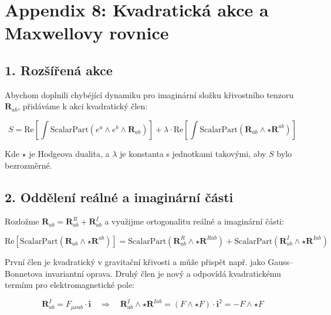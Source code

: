 
\appendix

\section*{Appendix 8: Kvadratick\'a akce a Maxwellovy rovnice}


\subsection*{1. Roz\v{s}\'{i}\v{r}en\'a akce}

Abychom doplnili chyb\'ej\'ic\'i dynamiku pro imagin\'arn\'i slo\v{z}ku k\v{r}ivostn\'iho tenzoru \( \mathbf{R}_{ab} \), p\v{r}id\'av\'ame k akci kvadratick\'y \v{c}len:

\begin{equation}
S = \text{Re} \left[ \int \text{ScalarPart} \left( e^a \wedge e^b \wedge \mathbf{R}_{ab} \right) \right] + \lambda \cdot \text{Re} \left[ \int \text{ScalarPart} \left( \mathbf{R}_{ab} \wedge \star \mathbf{R}^{ab} \right) \right]
\end{equation}

Kde \( \star \) je Hodgeova dualita, a \( \lambda \) je konstanta s jednotkami takov\'ymi, aby \( S \) bylo bezrozm\v{e}rn\'e.

\subsection*{2. Odd\v{e}len\'i re\'aln\'e a imagin\'arn\'i \v{c}\'asti}

Rozlo\v{z}me \( \mathbf{R}_{ab} = \mathbf{R}^R_{ab} + \mathbf{R}^I_{ab} \) a vyu\v{z}ijme ortogonalitu re\'aln\'e a imagin\'arn\'i \v{c}\'asti:

\begin{equation}
\text{Re} \left[ \text{ScalarPart}( \mathbf{R}_{ab} \wedge \star \mathbf{R}^{ab} ) \right] = \text{ScalarPart}( \mathbf{R}^R_{ab} \wedge \star \mathbf{R}^{R ab} ) + \text{ScalarPart}( \mathbf{R}^I_{ab} \wedge \star \mathbf{R}^{I ab} )
\end{equation}

Prvn\'i \v{c}len je kvadratick\'y v gravita\v{c}n\'i k\v{r}ivosti a m\v{u}\v{z}e p\v{r}isp\v{e}t nap\v{r}. jako Gauss--Bonnetova invariantn\'i oprava. Druh\'y \v{c}len je nov\'y a odpov\'id\'a kvadratick\'emu term\'inu pro elektromagnetick\'e pole:

\begin{equation}
\mathbf{R}^I_{ab} = F_{\mu\nu ab} \cdot \mathbf{i} \quad \Rightarrow \quad \mathbf{R}^I_{ab} \wedge \star \mathbf{R}^{I ab} = (F \wedge \star F) \cdot \mathbf{i}^2 = - F \wedge \star F
\end{equation}

